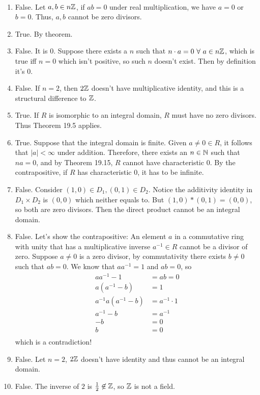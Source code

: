 \documentclass[12pt]{article}
\begin{document}
\begin{problem}[19.17]
~\begin{enumerate}[label=\alph*)]
	\item False. Let $ a,b \in n\mathbb{Z}$, if $ ab=0$ under real multiplication, we have  $ a=0$ or  $ b=0$. Thus,  $ a,b$ cannot be zero divisors.
	\item True. By theorem.
	\item False. It is 0. Suppose there exists a  $ n$  such that $ n \cdot a=0 \ \forall \ a \in n\mathbb{Z}$, which is true iff $ n=0$ which isn't positive, so such  $ n$ doesn't exist. Then by definition it's 0.
	\item False. If  $ n=2$, then  $ 2\mathbb{Z}$ doesn't have multiplicative identity, and this is a structural difference to $ \mathbb{Z}$.
	\item True. If $ R$ is isomorphic to an integral domain,  $ R$ must have no zero divisors. Thus Theorem 19.5 applies.
	\item True. Suppose that the integral domain is finite. Given  $ a \neq 0 \in R$, it follows that $ |a|< \infty$ under addition. Therefore, there exists an $ n \in \mathbb{N}$ such that $ na=0$, and by Theorem 19.15, $ R$ cannot have characteristic 0. By the contrapositive, if $ R$ has characteristic 0, it has to be infinite.
	\item False. Consider $ (1,0) \in D_1, (0,1) \in D_2$. Notice the additivity identity in $ D_1 \times D_2$ is $ (0,0)$ which neither equals to. But $(1,0) * (0,1) = (0,0)$, so both are zero divisors. Then the direct product cannot be an integral domain.
	\item False. Let's show the contrapositive: An element $ a$ in a commutative ring with unity  that has a multiplicative inverse $ a^{-1} \in R$ cannot be a divisor of zero.  Suppose $ a \neq 0$ is a zero divisor, by commutativity there exists $ b\neq 0$  such that $ ab=0$. We know that $ a a^{-1}=1$ and $ ab=0$, so
		\begin{align*}
			a a^{-1}-1 &= ab =0\\
			a(a^{-1} - b)&= 1 \\
			a^{-1}a (a^{-1} - b)&= a^{-1} \cdot 1 \\
			a^{-1} - b&= a^{-1} \\
			-b &= 0 \\
			b &= 0 \\
		\end{align*}
		which is a contradiction!
	\item False. Let $ n=2$,  $ 2\mathbb{Z}$ doesn't have identity and thus cannot be an integral domain.
	\item False. The inverse of $ 2$ is  $ \frac{1}{2} \not\in \mathbb{Z}$, so $ \mathbb{Z}$ is not a field.
\end{enumerate}
\end{problem}
\end{document}
